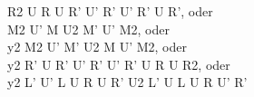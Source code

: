 R2 U R U R' U' R' U' R' U R', oder\\
M2 U' M U2 M' U' M2, oder\\
y2 M2 U' M' U2 M U' M2, oder\\
y2 R' U R' U' R' U' R' U R U R2, oder\\
y2 L' U' L U R U R' U2 L' U L U R U' R'\\
